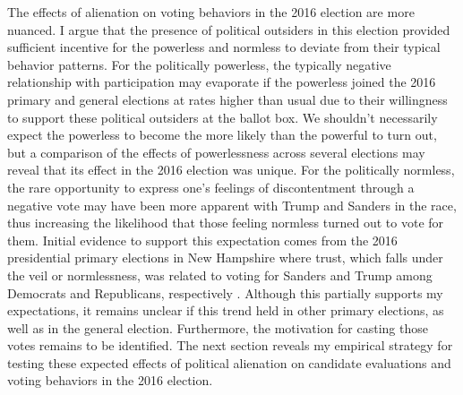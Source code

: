 \documentclass[12pt]{article}
\begin{document}
The effects of alienation on voting behaviors in the 2016 election are more nuanced. I argue that the presence of political outsiders in this election provided sufficient incentive for the powerless and normless to deviate from their typical behavior patterns. For the politically powerless, the typically negative relationship with participation may evaporate if the powerless joined the 2016 primary and general elections at rates higher than usual due to their willingness to support these political outsiders at the ballot box. We shouldn't necessarily expect the powerless to become the more likely than the powerful to turn out, but a comparison of the effects of powerlessness across several elections may reveal that its effect in the 2016 election was unique. For the politically normless, the rare opportunity to express one's feelings of discontentment through a negative vote may have been more apparent with Trump and Sanders in the race, thus increasing the likelihood that those feeling normless turned out to vote for them. Initial evidence to support this expectation comes from the 2016 presidential primary elections in New Hampshire where trust, which falls under the veil or normlessness, was related to voting for Sanders and Trump among Democrats and Republicans, respectively \parencite{dyck2018primary}. Although this partially supports my expectations, it remains unclear if this trend held in other primary elections, as well as in the general election. Furthermore, the motivation for casting those votes remains to be identified. The next section reveals my empirical strategy for testing these expected effects of political alienation on candidate evaluations and voting behaviors in the 2016 election. 









\end{document}
